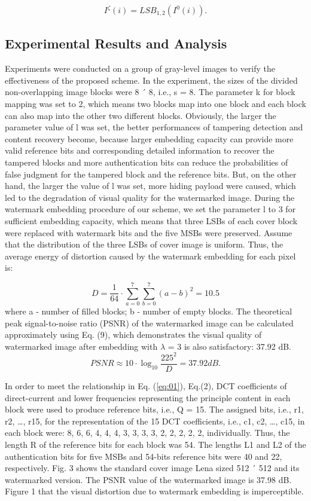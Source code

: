\documentclass[draft, {\secondLanguage}, english]{volcanica-template}
\begin{document}
\begin{equation}
I^\zeta(i) =  LSB_{1,2}(I^0(i)).
\end{equation}
    

\subsection{Experimental Results and Analysis}\label{sec:02a}
Experiments were conducted on a group of gray-level images to verify the effectiveness of the proposed scheme. In the experiment, the sizes of the divided non-overlapping image blocks were 8 ´ 8, i.e., s = 8. The parameter k for block mapping was set to 2, which means two blocks map into one block and each block can also map into the other two different blocks. Obviously, the larger the parameter value of l was set, the better performances of tampering detection and content recovery become, because larger embedding capacity can provide more valid reference bits and corresponding detailed information to recover the tampered blocks and more authentication bits can reduce the probabilities of false judgment for the tampered block and the reference bits. But, on the other hand, the larger the value of l was set, more hiding payload were caused, which led to the degradation of visual quality for the watermarked image. During the watermark embedding procedure of our scheme, we set the parameter l to 3 for sufficient embedding capacity, which means that three LSBs of each cover block were replaced with watermark bits and the five MSBs were preserved. Assume that the distribution of the three LSBs of cover image is uniform. Thus, the average energy of distortion caused by the watermark embedding for each pixel is: 

\begin{equation}
D =  \frac{1}{64} \cdot \sum_{a=0}^{7}\sum_{b=0}^{7}(a-b)^2 = 10.5\label{eq:01}
\end{equation}
    where a - number of filled blocks;
b - number of empty blocks.
The theoretical peak signal-to-noise ratio (PSNR) of the watermarked image can be calculated approximately using Eq. (9), which demonstrates the visual quality of watermarked image after embedding with $\lambda$ = 3 is also satisfactory: 37.92 dB. 
\begin{equation}
PSNR \approx 10\cdot \log_{10}{\frac{225^2}{D}}=37.92dB.\label{eq:02}
\end{equation}

In order to meet the relationship in Eq. (\autoref{eq:01}), Eq.(2), DCT coefficients of direct-current and lower frequencies representing the principle content in each block were used to produce reference bits, i.e., Q = 15. The assigned bits, i.e., r1, r2, …, r15, for the representation of the 15 DCT coefficients, i.e., c1, c2, …, c15, in each block were: 8, 6, 6, 4, 4, 4, 3, 3, 3, 3, 2, 2, 2, 2, 2, individually. Thus, the length R of the reference bits for each block was 54. The lengths L1 and L2 of the authentication bits for five MSBs and 54-bits reference bits were 40 and 22, respectively. Fig. 3 shows the standard cover image Lena sized 512 ´ 512 and its watermarked version. The PSNR value of the watermarked image is 37.98 dB. Figure 1 that the visual distortion due to watermark embedding is imperceptible.
\end{document}
